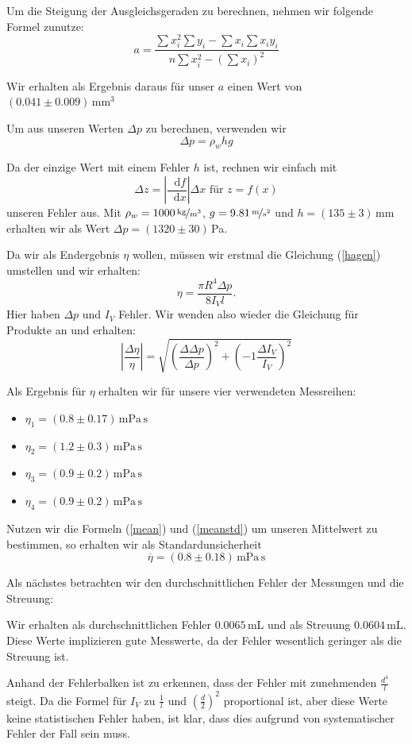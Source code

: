 \documentclass[11pt,a4paper]{article}
\newcommand\dif{\mathop{}\!\mathrm{d}}
\begin{document}
Um die Steigung der Ausgleichsgeraden zu berechnen, nehmen wir folgende Formel zunutze:
$$
a=\frac{\sum x_i^2\sum y_i-\sum x_i\sum x_iy_i}{n\sum x_i^2-(\sum x_i)^2}
$$

Wir erhalten als Ergebnis daraus f\"ur unser $a$ einen Wert von $(0.041\pm0.009)\,\mathrm{mm}^3$

Um aus unseren Werten $\Delta p$ zu berechnen, verwenden wir
$$
\Delta p=\rho_w hg
$$

Da der einzige Wert mit einem Fehler $h$ ist, rechnen wir einfach mit
$$
\Delta z=\left|\frac{\dif f}{\dif x}\right|\Delta x\textrm{ f\"ur }z=f(x)
$$
unseren Fehler aus.
Mit $\rho_w=1000\,\nicefrac{\mathrm{kg}}{\mathrm{m}^3}$, $g=9.81\,\nicefrac{\mathrm{m}}{\mathrm{s}^2}$ und $h=(135\pm3)\,\mathrm{mm}$ erhalten wir als Wert $\Delta p=(1320\pm30)\,$Pa.

Da wir als Endergebnis $\eta$ wollen, m\"ussen wir erstmal die Gleichung (\ref{hagen}) umstellen und wir erhalten:
$$
\eta=\frac{\pi R^4\Delta p}{8I_V l}.
$$
Hier haben $\Delta p$ und $I_V$ Fehler. Wir wenden also wieder die Gleichung f\"ur Produkte an und erhalten:
$$
\left\vert\frac{\Delta\eta}{\eta}\right\vert=\sqrt{\left(\frac{\Delta\Delta p}{\Delta p}\right)^2+\left(-1\frac{\Delta I_V}{I_V}\right)^2}
$$

Als Ergebnis f\"ur $\eta$ erhalten wir f\"ur unsere vier verwendeten Messreihen:
\begin{itemize}
\item $\eta_1 = (0.8\pm0.17)\,\mathrm{mPa\,s}$
\item $\eta_2 =(1.2\pm0.3)\,\mathrm{mPa\,s}$
\item $\eta_3 =(0.9\pm0.2)\,\mathrm{mPa\,s}$
\item $\eta_4 =(0.9\pm0.2)\,\mathrm{mPa\,s}$
\end{itemize}


Nutzen wir die Formeln (\ref{mean}) und (\ref{meanstd}) um unseren Mittelwert zu bestimmen, so erhalten wir als Standardunsicherheit
\[
\overline{\eta} = (0.8\pm0.18)\,\mathrm{mPa\,s}
\]

Als n\"achstes betrachten wir den durchschnittlichen Fehler der Messungen und die Streuung:

Wir erhalten als durchschnittlichen Fehler $0.0065\,$mL und als Streuung $0.0604\,$mL. Diese Werte implizieren gute Messwerte, da der Fehler wesentlich geringer als die Streuung ist.

Anhand der Fehlerbalken ist zu erkennen, dass der Fehler mit zunehmenden $\frac{d^4}{l}$ steigt. Da die Formel f\"ur $I_V$ zu  $\frac{1}{l}$ und $\left(\frac{d}{2}\right)^2$ proportional ist, aber diese Werte keine statistischen Fehler haben, ist klar, dass dies aufgrund von systematischer Fehler der Fall sein muss.
\end{document}
